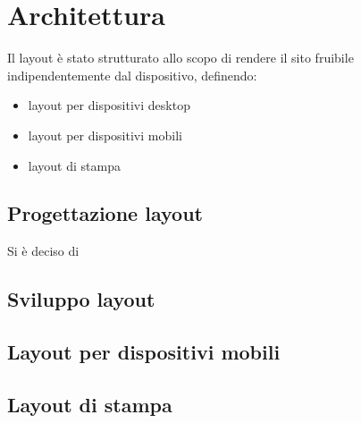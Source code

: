 \section{Architettura}{
	Il layout è stato strutturato allo scopo di rendere il sito fruibile indipendentemente dal dispositivo, definendo:
	\begin{itemize}\itemsep1pt
		\item layout per dispositivi desktop
		\item layout per dispositivi mobili
		\item layout di stampa
	\end{itemize} 
	
	\subsection{Progettazione layout}{
		Si è deciso di 
	}
	\subsection{Sviluppo layout}{
		}
	\subsection{Layout per dispositivi mobili}{
		
	}
	\subsection{Layout di stampa}{
		
	}
}